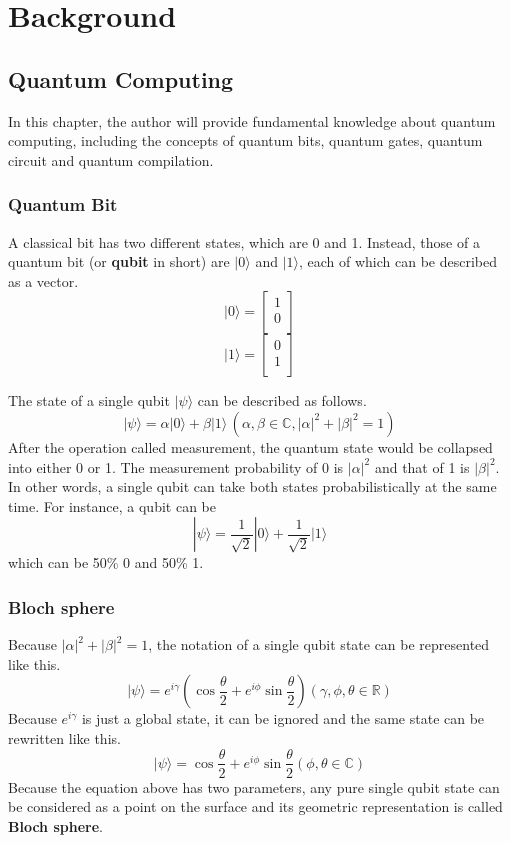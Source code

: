 \chapter{Background}
\label{theory_of_quantum_information}
\section{ Quantum Computing}

 In this chapter, the author will provide fundamental knowledge about quantum computing, including the concepts of quantum bits, quantum gates, quantum circuit and quantum compilation.

\subsection{Quantum Bit}

 A classical bit has two different states, which are 0 and 1.   Instead, those of a quantum bit (or \textbf{qubit} in short) are $|0\rangle$ and $|1\rangle$, each of which can be described as a vector.  
 $$|0\rangle = \left[
\begin{array}{c}
1 \\
0 \\
\end{array}
\right]$$
 $$|1\rangle = \left[
\begin{array}{c}
0 \\
1 \\
\end{array}
\right]$$

The state of a single 	qubit $|\psi\rangle$ can be described as follows.
$$ |\psi\rangle = \alpha |0\rangle + \beta |1\rangle \,(\alpha, \beta \in \mathbb{C}, |\alpha|^2+|\beta|^2=1)$$
 After the operation called measurement, the quantum state would be collapsed into either 0 or 1.  The measurement probability of 0 is $|\alpha|^2$ and that of 1 is $|\beta|^2$. In other words, a single qubit can take both states probabilistically at the same time.  For instance, a qubit can be $$|\psi\rangle = \frac{1}{\sqrt{2}}|0\rangle + \frac{1}{\sqrt{2}}|1\rangle$$ which can be 50\% 0 and 50\% 1.
 
 \subsection{Bloch sphere}
 	Because $|\alpha|^2 + |\beta|^2 = 1$, the notation of a single qubit state can be represented like this.
	$$ |\psi\rangle = e^{i\gamma} (\cos{\frac{\theta}{2}} + e^{i\phi} \sin{\frac{\theta}{2}}) (\gamma, \phi, \theta \in \mathbb{R})$$ 
	Because $e^{i\gamma}$ is just a global state, it can be ignored and the same state can be rewritten like this.
	$$ |\psi\rangle =  \cos{\frac{\theta}{2}} + e^{i\phi} \sin{\frac{\theta}{2}} (\phi, \theta \in \mathbb{C})$$ 
	Because the equation above has two parameters,  any pure single qubit state can be considered as a point on the surface and its geometric representation is called \textbf{Bloch sphere}.
	
